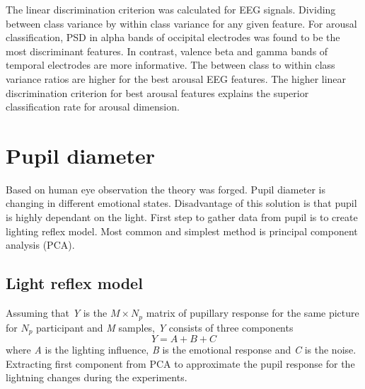 \documentclass[10pt,journal,compsoc,twoside]{IEEEtran}
\begin{document}
The linear discrimination criterion was calculated for EEG signals. Dividing between class variance by within class variance for any given feature.
For arousal classification, PSD in alpha bands of occipital electrodes was found to be the most discriminant features. In contrast, valence beta and gamma bands of temporal electrodes are more informative. The between class to within class variance ratios are higher for the best arousal EEG features. The higher linear discrimination criterion for best arousal features explains the superior classification rate for arousal dimension.



\section{Pupil diameter}
Based on human eye observation the theory was forged. Pupil diameter is changing in different emotional states. Disadvantage of this solution is that pupil is highly dependant on the light. First step to gather data from pupil is to create lighting reflex model. Most common and simplest method is principal component analysis (PCA).
\subsection{Light reflex model}
Assuming that \textit{Y} is the $M \times N_{p}$ matrix of pupillary response for the same picture for \textit{$N_{p}$} participant and \textit{M} samples, \textit{Y} consists of three components
\begin{equation}
Y = A + B + C
\end{equation}
where \textit{A} is the lighting influence, \textit{B} is the emotional response and \textit{C} is the noise. Extracting first component from PCA to approximate the pupil response for the lightning changes during the experiments.
\end{document}
